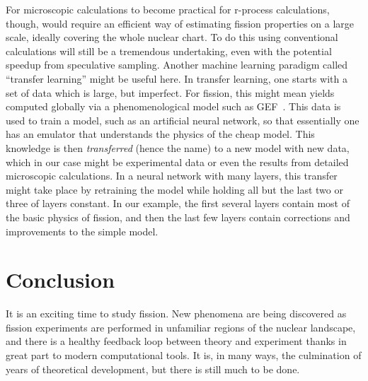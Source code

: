 For microscopic calculations to become practical for r-process calculations, though, would require an efficient way of estimating fission properties on a large scale, ideally covering the whole nuclear chart. To do this using conventional calculations will still be a tremendous undertaking, even with the potential speedup from speculative sampling. Another machine learning paradigm called ``transfer learning'' might be useful here. In transfer learning, one starts with a set of data which is large, but imperfect. For fission, this might mean yields computed globally via a phenomenological model such as GEF~\cite{Schmidt2016}. This data is used to train a model, such as an artificial neural network, so that essentially one has an emulator that understands the physics of the cheap model. This knowledge is then \textit{transferred} (hence the name) to a new model with new data, which in our case might be experimental data or even the results from detailed microscopic calculations. In a neural network with many layers, this transfer might take place by retraining the model while holding all but the last two or three of layers constant. In our example, the first several layers contain most of the basic physics of fission, and then the last few layers contain corrections and improvements to the simple model.


\section{Conclusion}
It is an exciting time to study fission. New phenomena are being discovered as fission experiments are performed in unfamiliar regions of the nuclear landscape, and there is a healthy feedback loop between theory and experiment thanks in great part to modern computational tools. It is, in many ways, the culmination of years of theoretical development, but there is still much to be done.